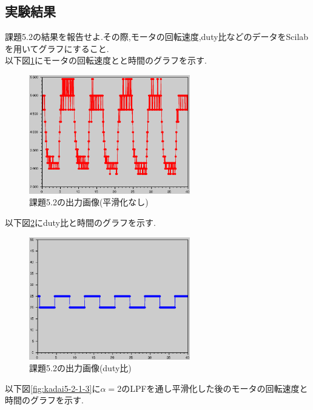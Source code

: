 \documentclass{jarticle}
\begin{document}
\subsection{実験結果}
課題5.2の結果を報告せよ.その際,モータの回転速度,duty比などのデータをScilabを用いてグラフにすること. \\

以下図\ref{fig:kadai5-2-1-1}にモータの回転速度とと時間のグラフを示す.

\begin{figure}[H]
\begin{center}
\includegraphics[width=7.0cm]{images/kadai5-2-1-1.eps}
\caption{課題5.2の出力画像(平滑化なし)}
\label{fig:kadai5-2-1-1}
\end{center}
\end{figure}


以下図\ref{fig:kadai5-2-1-2}にduty比と時間のグラフを示す.

\begin{figure}[H]
\begin{center}
\includegraphics[width=7.0cm]{images/kadai5-2-1-2.eps}
\caption{課題5.2の出力画像(duty比)}
\label{fig:kadai5-2-1-2}
\end{center}
\end{figure}


以下図\ref{fig:kadai5-2-1-3}に$\alpha=2$のLPFを通し平滑化した後のモータの回転速度と時間のグラフを示す.
\end{document}
